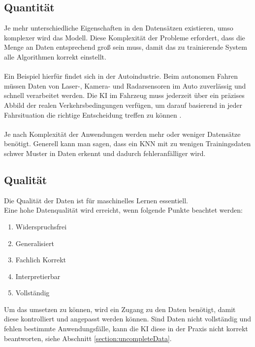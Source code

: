 \documentclass[12pt,oneside,a4paper,parskip]{scrbook}
\begin{document}
\subsection{Quantität}
\label{section:DataQuantity}
Je mehr unterschiedliche Eigenschaften in den Datensätzen existieren, umso komplexer wird das Modell. Diese Komplexität der Probleme erfordert, dass die Menge an Daten entsprechend groß sein muss, damit das zu trainierende System alle Algorithmen korrekt einstellt.
\\\\
Ein Beispiel hierfür findet sich in der Autoindustrie. Beim autonomen Fahren müssen Daten von Laser-, Kamera- und Radarsensoren im Auto zuverlässig und schnell verarbeitet werden. Die KI im Fahrzeug muss jederzeit über ein präzises Abbild der realen Verkehrsbedingungen verfügen, um darauf basierend in jeder Fahrsituation die richtige Entscheidung treffen zu können \cite{autonomesFahren}.
\\\\
Je nach Komplexität der Anwendungen werden mehr oder weniger Datensätze benötigt. Generell kann man sagen, dass ein KNN mit zu wenigen Trainingsdaten schwer Muster in Daten erkennt und dadurch fehleranfälliger wird.

\subsection{Qualität}
\label{section:DataQuality}

Die Qualität der Daten ist für maschinelles Lernen essentiell. \\Eine hohe Datenqualität wird erreicht, wenn folgende Punkte beachtet werden:
\begin{enumerate}
	\item Widerspruchsfrei
	\item Generalisiert
	\item Fachlich Korrekt
	\item Interpretierbar
	\item Vollständig
\end{enumerate}

Um das umsetzen zu können, wird ein Zugang zu den Daten benötigt, damit diese kontrolliert und angepasst werden können. Sind Daten nicht vollständig und fehlen bestimmte Anwendungsfälle, kann die KI diese in der Praxis nicht korrekt beantworten, siehe Abschnitt \ref{section:uncompleteData}.
\end{document}
